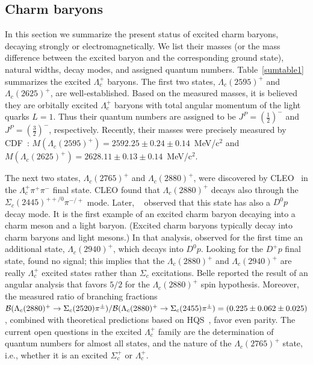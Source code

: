 \subsection{Charm baryons}


In this section we summarize the present status of excited charm
baryons, decaying strongly or electromagnetically. We list their
masses (or the mass difference between the excited baryon and the
corresponding ground state), natural widths, decay modes, and 
assigned quantum numbers. 
Table~\ref{sumtable1} summarizes the excited $\Lambda_c^+$ baryons.  
The first two states, $\Lambda_c(2595)^+$ and $\Lambda_c(2625)^+$,
are well-established. 
Based on the measured masses, it is believed they are orbitally 
excited $\Lambda_c^+$ baryons with total angular momentum of the
light quarks $L=1$. Thus their quantum numbers are assigned to be 
$J^P=(\frac{1}{2})^-$ and $J^P=(\frac{3}{2})^-$, respectively. 
Recently, their masses 
were precisely measured by CDF~\cite{Aaltonen:2011sf}: 
$M(\Lambda_c(2595)^+)=2592.25\pm 0.24\pm 0.14$~MeV/c$^2$ and
$M(\Lambda_c(2625)^+)=2628.11\pm 0.13\pm 0.14$~MeV/c$^2$. 

The next two states, $\Lambda_c(2765)^+$ and $\Lambda_c(2880)^+$, 
were discovered by CLEO~\cite{Artuso:2000xy} in the $\Lambda_c^+\pi^+\pi^-$ 
final state. CLEO found that $\Lambda_c(2880)^+$ decays also through
the $\Sigma_c(2445)^{++/0}\pi^{-/+}$ mode. 
Later, \babar~\cite{Aubert:2006sp} 
observed that this state has also a $D^0 p$ decay mode. It is the 
first example of an excited charm baryon decaying into a charm meson 
and a light baryon. (Excited charm baryons typically decay into charm 
baryons and light mesons.) In that analysis, \babar observed for the
first time an additional state, $\Lambda_c(2940)^+$, 
which decays into $D^0 p$. Looking for the $D^+ p$ final state,
\babar found no signal; this implies that the $\Lambda_c(2880)^+$ 
and $\Lambda_c(2940)^+$ are really $\Lambda_c^+$ excited states
rather than $\Sigma_c$ excitations. 
Belle reported the result of an angular analysis that favors
$5/2$ for the $\Lambda_c(2880)^+$ spin hypothesis. 
Moreover, the measured ratio of branching fractions 
${\cal B}(\Lambda_c(2880)^+\rightarrow \Sigma_c(2520)\pi^{\pm})/{\cal B}(\Lambda_c(2880)^+\rightarrow \Sigma_c(2455)\pi^{\pm})=(0.225\pm 0.062\pm 0.025)$, combined 
with theoretical predictions based on HQS~\cite{Isgur:1991wq,Cheng:2006dk}, 
favor even parity.     
The current open questions in the excited $\Lambda_c^+$ family are
the determination of quantum numbers for almost all states, and 
the nature of the $\Lambda_c(2765)^+$ state, i.e., whether it is
an excited $\Sigma_c^+$ or $\Lambda_c^+$.

